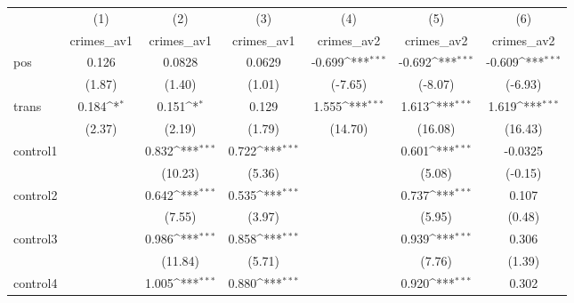 {
\def\sym#1{\ifmmode^{#1}\else\(^{#1}\)\fi}
\begin{tabular}{l*{6}{c}}
\hline\hline
            &\multicolumn{1}{c}{(1)}&\multicolumn{1}{c}{(2)}&\multicolumn{1}{c}{(3)}&\multicolumn{1}{c}{(4)}&\multicolumn{1}{c}{(5)}&\multicolumn{1}{c}{(6)}\\
            &\multicolumn{1}{c}{crimes\_av1}&\multicolumn{1}{c}{crimes\_av1}&\multicolumn{1}{c}{crimes\_av1}&\multicolumn{1}{c}{crimes\_av2}&\multicolumn{1}{c}{crimes\_av2}&\multicolumn{1}{c}{crimes\_av2}\\
\hline
pos         &       0.126         &      0.0828         &      0.0629         &      -0.699\sym{***}&      -0.692\sym{***}&      -0.609\sym{***}\\
            &      (1.87)         &      (1.40)         &      (1.01)         &     (-7.65)         &     (-8.07)         &     (-6.93)         \\
[1em]
trans       &       0.184\sym{*}  &       0.151\sym{*}  &       0.129         &       1.555\sym{***}&       1.613\sym{***}&       1.619\sym{***}\\
            &      (2.37)         &      (2.19)         &      (1.79)         &     (14.70)         &     (16.08)         &     (16.43)         \\
[1em]
control1    &                     &       0.832\sym{***}&       0.722\sym{***}&                     &       0.601\sym{***}&     -0.0325         \\
            &                     &     (10.23)         &      (5.36)         &                     &      (5.08)         &     (-0.15)         \\
[1em]
control2    &                     &       0.642\sym{***}&       0.535\sym{***}&                     &       0.737\sym{***}&       0.107         \\
            &                     &      (7.55)         &      (3.97)         &                     &      (5.95)         &      (0.48)         \\
[1em]
control3    &                     &       0.986\sym{***}&       0.858\sym{***}&                     &       0.939\sym{***}&       0.306         \\
            &                     &     (11.84)         &      (5.71)         &                     &      (7.76)         &      (1.39)         \\
[1em]
control4    &                     &       1.005\sym{***}&       0.880\sym{***}&                     &       0.920\sym{***}&       0.302         \\

\end{tabular}}
